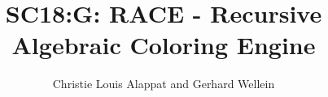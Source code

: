 \documentclass[sigplan]{acmart}
\begin{document}
	
	\title[RACE]{SC18:G: RACE - Recursive Algebraic Coloring Engine}
	
	\author{Christie Louis Alappat and Gerhard Wellein} 
	
	
	
	
	
	
	
	
	
	\renewcommand{\shortauthors}{C. Alappat}
	
	

	
	
	
	
	
	\maketitle
	
	
	
	
	
	
\end{document}
